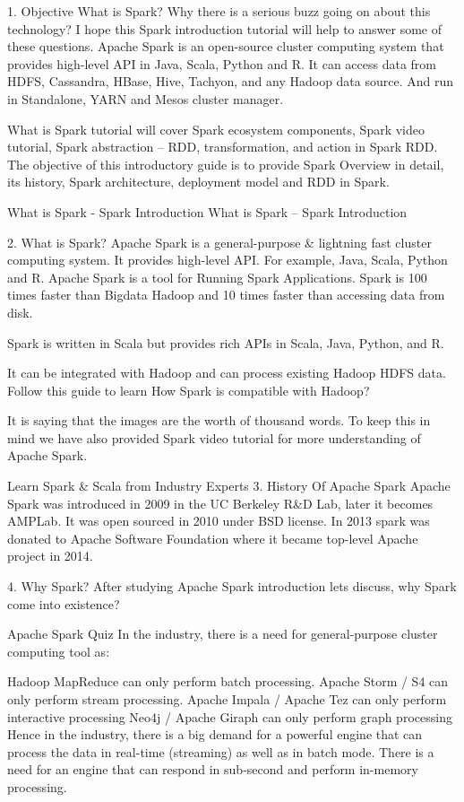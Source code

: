 
1. Objective
What is Spark? Why there is a serious buzz going on about this technology? I hope this Spark introduction tutorial will help to answer some of these questions. Apache Spark is an open-source cluster computing system that provides high-level API in Java, Scala, Python and R. It can access data from HDFS, Cassandra, HBase, Hive, Tachyon, and any Hadoop data source. And run in Standalone, YARN and Mesos cluster manager.

What is Spark tutorial will cover Spark ecosystem components, Spark video tutorial, Spark abstraction – RDD, transformation, and action in Spark RDD. The objective of this introductory guide is to provide Spark Overview in detail, its history, Spark architecture, deployment model and RDD in Spark.

What is Spark - Spark Introduction
What is Spark – Spark Introduction

2. What is Spark?
Apache Spark is a general-purpose & lightning fast cluster computing system. It provides high-level API. For example, Java, Scala, Python and R. Apache Spark is a tool for Running Spark Applications. Spark is 100 times faster than Bigdata Hadoop and 10 times faster than accessing data from disk.

Spark is written in Scala but provides rich APIs in Scala, Java, Python, and R.

It can be integrated with Hadoop and can process existing Hadoop HDFS data. Follow this guide to learn How Spark is compatible with Hadoop?

It is saying that the images are the worth of thousand words. To keep this in mind we have also provided Spark video tutorial for more understanding of Apache Spark.

Learn Spark & Scala from Industry Experts
3. History Of Apache Spark
Apache Spark was introduced in 2009 in the UC Berkeley R&D Lab, later it becomes AMPLab. It was open sourced in 2010 under BSD license. In 2013 spark was donated to Apache Software Foundation where it became top-level Apache project in 2014.

4. Why Spark?
After studying Apache Spark introduction lets discuss, why Spark come into existence?

 Apache Spark Quiz
In the industry, there is a need for general-purpose cluster computing tool as:

Hadoop MapReduce can only perform batch processing.
Apache Storm / S4 can only perform stream processing.
Apache Impala / Apache Tez can only perform interactive processing
Neo4j / Apache Giraph can only perform graph processing
Hence in the industry, there is a big demand for a powerful engine that can process the data in real-time (streaming) as well as in batch mode. There is a need for an engine that can respond in sub-second and perform in-memory processing.

